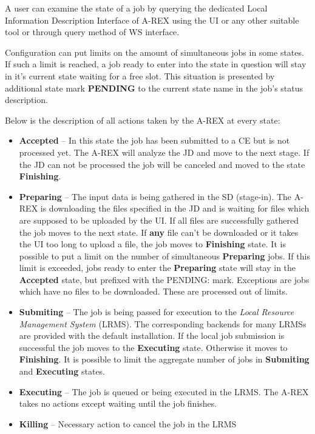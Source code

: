 \documentclass{article}                            %
\begin{document}
A user can examine the state of a job by querying the dedicated Local
Information Description Interface of A-REX using the UI or any other
suitable tool or through query method of WS interface. 

Configuration can put limits on the amount of simultaneous jobs in
some states. If such a limit is reached, a job ready to enter into
the state in question will stay in it's current state waiting for
a free slot. This situation is presented by additional state mark
\textbf{PENDING} to the current state name in the job's status description.

Below is the description of all actions taken by the A-REX at every
state:

\begin{itemize}
\item \textbf{Accepted} -- In this state the job has been submitted to a
CE but is not processed yet. The A-REX will analyze the JD and move
to the next stage. If the JD can not be processed the job will be
canceled and moved to the state \textbf{Finishing}.
\item \textbf{Preparing} -- The input data is being gathered in the SD (stage-in).
The A-REX is downloading the files specified in the JD and is waiting
for files which are supposed to be uploaded by the UI. If all files
are successfully gathered the job moves to the next state. If \textbf{any}
file can't be downloaded or it takes the UI too long to upload a file,
the job moves to \textbf{Finishing} state. It is possible to put a
limit on the number of simultaneous \textbf{Preparing} jobs. If this
limit is exceeded, jobs ready to enter the \textbf{Preparing} state
 will stay in the \textbf{Accepted} state, but prefixed with the PENDING:
mark. Exceptions are jobs which have no files to be downloaded. These
are processed out of limits.
\item \textbf{Submiting} -- The job is being passed for execution to the
\emph{Local Resource Management System} (LRMS). The corresponding
backends for many LRMSs are provided with the default installation.
If the local job submission is successful the job moves to the \textbf{Executing}
state. Otherwise it moves to \textbf{Finishing}. It is possible to
limit the aggregate number of jobs in \textbf{Submiting} and \textbf{Executing}
states.
\item \textbf{Executing} -- The job is queued or being executed in the LRMS.
The A-REX takes no actions except waiting until the job finishes.
\item \textbf{Killing} -- Necessary action to cancel the job in the LRMS

\end{itemize}
\end{document}
